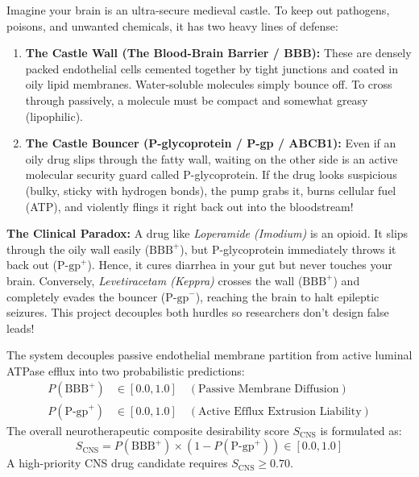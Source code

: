 \documentclass[11pt,a4paper]{article}
\begin{document}
\begin{laymanbox}
Imagine your brain is an ultra-secure medieval castle. To keep out pathogens, poisons, and unwanted chemicals, it has two heavy lines of defense:
\begin{enumerate}[leftmargin=*]
    \item \textbf{The Castle Wall (The Blood-Brain Barrier / BBB):} These are densely packed endothelial cells cemented together by tight junctions and coated in oily lipid membranes. Water-soluble molecules simply bounce off. To cross through passively, a molecule must be compact and somewhat greasy (lipophilic).
    \item \textbf{The Castle Bouncer (P-glycoprotein / P-gp / ABCB1):} Even if an oily drug slips through the fatty wall, waiting on the other side is an active molecular security guard called P-glycoprotein. If the drug looks suspicious (bulky, sticky with hydrogen bonds), the pump grabs it, burns cellular fuel (ATP), and violently flings it right back out into the bloodstream!
\end{enumerate}

\textbf{The Clinical Paradox:} A drug like \textit{Loperamide (Imodium)} is an opioid. It slips through the oily wall easily ($\text{BBB}^+$), but P-glycoprotein immediately throws it back out ($\text{P-gp}^+$). Hence, it cures diarrhea in your gut but never touches your brain. Conversely, \textit{Levetiracetam (Keppra)} crosses the wall ($\text{BBB}^+$) and completely evades the bouncer ($\text{P-gp}^-$), reaching the brain to halt epileptic seizures. This project decouples both hurdles so researchers don't design false leads!
\end{laymanbox}

\begin{mathspecbox}
The system decouples passive endothelial membrane partition from active luminal ATPase efflux into two probabilistic predictions:
\begin{align}
P(\text{BBB}^+) &\in [0.0, 1.0] \quad (\text{Passive Membrane Diffusion}) \\
P(\text{P-gp}^+) &\in [0.0, 1.0] \quad (\text{Active Efflux Extrusion Liability})
\end{align}
The overall neurotherapeutic composite desirability score $S_{\text{CNS}}$ is formulated as:
\begin{equation}
S_{\text{CNS}} = P(\text{BBB}^+) \times \left(1 - P(\text{P-gp}^+)\right) \in [0.0, 1.0]
\end{equation}
A high-priority CNS drug candidate requires $S_{\text{CNS}} \ge 0.70$.
\end{mathspecbox}
\end{document}

